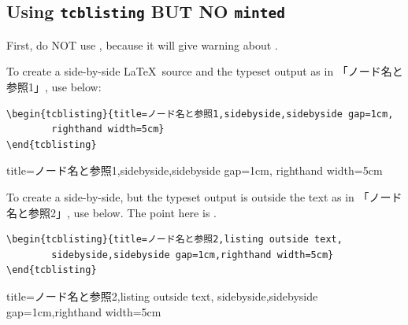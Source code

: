 \documentclass[../geometrymemo.tex]{subfiles}
\begin{document}
\subsection{Using \textbf{\texttt{tcblisting}} BUT NO \textbf{\texttt{minted}}}

First, do NOT use , because it will give warning about .

To create a side-by-side \LaTeX~source and the typeset output as in 「ノード名と参照1」, use below:
\begin{tcolorbox}
    \begin{verbatim}
\begin{tcblisting}{title=ノード名と参照1,sidebyside,sidebyside gap=1cm,
        righthand width=5cm}
\end{tcblisting}
\end{verbatim}
\end{tcolorbox}
\begin{tcblisting}{title=ノード名と参照1,sidebyside,sidebyside gap=1cm,
        righthand width=5cm}
\end{tcblisting}

To create a side-by-side, but the typeset output is outside the text as in 「ノード名と参照2」, use below. The point here is .
\begin{tcolorbox}
    \begin{verbatim}
\begin{tcblisting}{title=ノード名と参照2,listing outside text,
        sidebyside,sidebyside gap=1cm,righthand width=5cm}
\end{tcblisting}
\end{verbatim}
\end{tcolorbox}
\begin{tcblisting}{title=ノード名と参照2,listing outside text,
        sidebyside,sidebyside gap=1cm,righthand width=5cm}
\end{tcblisting}
\end{document}
